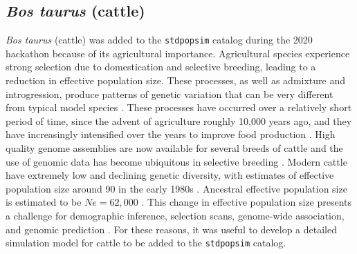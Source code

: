 \documentclass[hidelinks]{article}
\newcommand{\stdpopsim}{\texttt{stdpopsim}\xspace}
\begin{document}
\hypertarget{bos-taurus}{%
	\subsection*{\texorpdfstring{\emph{Bos
				taurus} (cattle)}{Bos taurus (cattle)}}\label{bos-taurus}}

\emph{Bos taurus} (cattle) was added to the \stdpopsim catalog during the 2020 hackathon because of its agricultural importance. Agricultural species experience
strong selection due to domestication and selective breeding, leading
to a reduction in effective population size. These processes,
as well as admixture and introgression, produce patterns
of genetic variation that can be very different from typical model
species \citep{Larson2013}. These processes have occurred over a
relatively short period of time, since the advent of agriculture roughly 10,000 years ago, and they have increasingly intensified over the years to improve food production \citep{Gaut2018,MacLeod2013}. High quality genome assemblies are now
available for several breeds of cattle \citep[e.g.,][]{Rosen2020, Heaton2021,
Talenti2022} and the use of genomic data has become ubiquitous
in selective breeding \citep{Meuwissen2001,
MacLeod2014, Obsteter2021, Cesarani2022}. Modern cattle have extremely low and declining genetic diversity,
with estimates of effective population size around 90 in the early 1980s \citep{MacLeod2013, VanRaden2020, Makanjouloa2020}.
Ancestral effective population size is estimated to be $Ne=62,000$ \citep{MacLeod2013}.
This change in effective population size presents a challenge for demographic inference, 
selection scans, genome-wide association, and genomic prediction
\citep{MacLeod2013,MacLeod2014,Hartfield2022}. 
For these reasons, it was useful to develop a detailed simulation model for cattle to be added to the \stdpopsim catalog.
\end{document}
